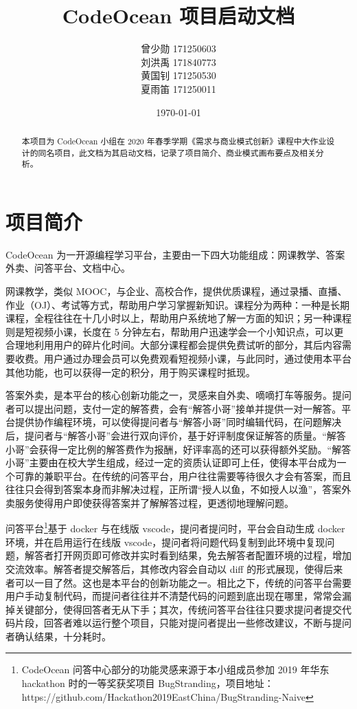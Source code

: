 \documentclass[a4paper]{ctexart}
\title{CodeOcean 项目启动文档}
\author{
  曾少勋 171250603\\
  刘洪禹 171840773\\
  黄国钊 171250530\\
  夏雨笛 171250011\\
}
\date{\today}
\begin{document}
\maketitle

\begin{abstract}
  本项目为 CodeOcean 小组在 2020 年春季学期《需求与商业模式创新》课程中大作业设计的同名项目，此文档为其启动文档，记录了项目简介、商业模式画布要点及相关分析。
\end{abstract}

\tableofcontents

\newpage

\setlength{\parskip}{1em}


\section{项目简介}

CodeOcean 为一开源编程学习平台，主要由一下四大功能组成：网课教学、答案外卖、问答平台、文档中心。

网课教学，类似 MOOC，与企业、高校合作，提供优质课程，通过录播、直播、作业（OJ）、考试等方式，帮助用户学习掌握新知识。课程分为两种：一种是长期课程，全程往往在十几小时以上，帮助用户系统地了解一方面的知识；另一种课程则是短视频小课，长度在 5 分钟左右，帮助用户迅速学会一个小知识点，可以更合理地利用用户的碎片化时间。大部分课程都会提供免费试听的部分，其后内容需要收费。用户通过办理会员可以免费观看短视频小课，与此同时，通过使用本平台其他功能，也可以获得一定的积分，用于购买课程时抵现。

答案外卖，是本平台的核心创新功能之一，灵感来自外卖、嘀嘀打车等服务。提问者可以提出问题，支付一定的解答费，会有“解答小哥”接单并提供一对一解答。平台提供协作编程环境，可以使得提问者与“解答小哥”同时编辑代码，在问题解决后，提问者与“解答小哥”会进行双向评价，基于好评制度保证解答的质量。“解答小哥”会获得一定比例的解答费作为报酬，好评率高的还可以获得额外奖励。“解答小哥”主要由在校大学生组成，经过一定的资质认证即可上任，使得本平台成为一个可靠的兼职平台。在传统的问答平台，用户往往需要等待很久才会有答案，而且往往只会得到答案本身而非解决过程，正所谓“授人以鱼，不如授人以渔”，答案外卖服务使得用户即使获得答案并了解解答过程，更透彻地理解问题。

问答平台\footnote{CodeOcean 问答中心部分的功能灵感来源于本小组成员参加 2019 年华东 hackathon 时的一等奖获奖项目 BugStranding，项目地址：https://github.com/Hackathon2019EastChina/BugStranding-Naive}基于 docker 与在线版 vscode，提问者提问时，平台会自动生成 docker 环境，并在启用运行在线版 vscode，提问者将问题代码复制到此环境中复现问题，解答者打开网页即可修改并实时看到结果，免去解答者配置环境的过程，增加交流效率。解答者提交解答后，其修改内容会自动以 diff 的形式展现，使得后来者可以一目了然。这也是本平台的创新功能之一。相比之下，传统的问答平台需要用户手动复制代码，而提问者往往并不清楚代码的问题到底出现在哪里，常常会漏掉关键部分，使得回答者无从下手；其次，传统问答平台往往只要求提问者提交代码片段，回答者难以运行整个项目，只能对提问者提出一些修改建议，不断与提问者确认结果，十分耗时。
\end{document}
